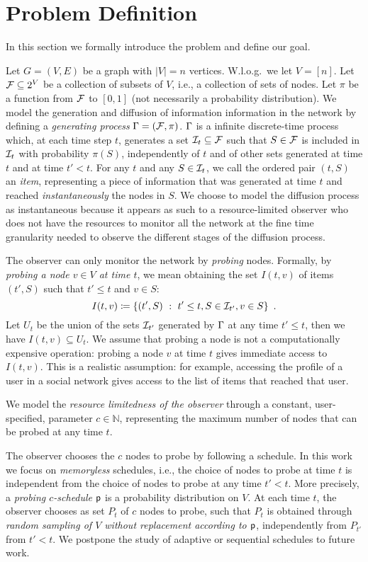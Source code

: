 \section{Problem Definition}\label{sec:prelims}
In this section we formally introduce the problem and define our goal.

Let $G=(V,E)$ be a graph with $|V|=n$ vertices. W.l.o.g.~we let $V=[n]$. Let
$\mathcal{F}\subseteq 2^V$ be a collection of subsets of $V$, i.e., a collection of
sets of nodes. Let $\pi$ be a function from $\mathcal{F}$ to $[0,1]$ (not
necessarily a probability distribution). We model the generation and diffusion
of information information in the network by defining a \emph{generating
process} $\Gamma=(\mathcal{F},\pi)$.  $\Gamma$ is a infinite discrete-time process
which, at each time step $t$, generates a set $\mathcal{I}_t\subseteq\mathcal{F}$ such
that $S\in\mathcal{F}$ is included in $\mathcal{I}_t$ with probability $\pi(S)$,
independently of $t$ and of other sets generated at time $t$ and at time $t'<t$.
For any $t$ and any $S\in\mathcal{I}_t$, we call the ordered pair $(t,S)$ an
\emph{item}, representing a piece of information that was generated at time $t$
and reached \emph{instantaneously} the nodes in $S$.  We choose to model the
diffusion process as instantaneous because it appears as such to a
resource-limited observer who does not have the resources to monitor all the
network at the fine time granularity needed to observe the different stages of
the diffusion process.

 The observer can only monitor the network by
\emph{probing} nodes. Formally, by \emph{probing a node $v\in V$ at time $t$},
we mean obtaining the set $I(t,v)$ of items $(t',S)$ such
that $t'\le t$ and $v\in S$:
\[
	I(t,v)\coloneqq\{(t',S) ~:~ t'\le t, S\in\mathcal{I}_{t'}, v\in S\}\enspace.
\]
Let $U_t$ be the union of the sets $\mathcal{I}_{t'}$ generated by $\Gamma$
at any time $t'\le t$, then we have $I(t,v)\subseteq U_t$. We assume that
probing a node is not a computationally expensive operation: probing a node $v$
at time $t$ gives immediate access to $I(t,v)$. This is a realistic assumption:
for example, accessing the profile of a user in a social network gives access to
the list of items that reached that user.

We model the \emph{resource limitedness of the observer} through a constant,
user-specified, parameter $c\in\mathbb{N}$, representing the maximum number of
nodes that can be probed at any time $t$.

The observer chooses the $c$ nodes to probe by following a schedule. In this work
we focus on \emph{memoryless} schedules, i.e., the choice of nodes to probe at
time $t$ is independent from the choice of nodes to probe at any time $t'<t$.
More precisely, a \emph{probing $c$-schedule} $\mathsf{p}$ is a probability
distribution on $V$. At each time $t$, the observer chooses as set $P_t$ of $c$
nodes to probe, such that $P_t$ is obtained through \emph{random sampling of $V$
without replacement according to $\mathsf{p}$}, independently from $P_{t'}$ from
$t'< t$. We postpone the study of adaptive or sequential schedules to future
work.

